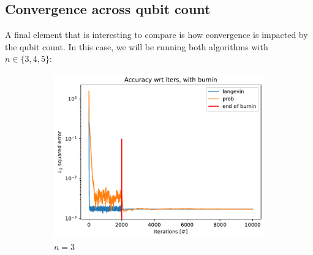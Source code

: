 \documentclass[12pt]{memoir}
\begin{document}
\subsection*{Convergence across qubit count}


A final element that is interesting to compare is how convergence is impacted by the qubit count. In this case, we will be running both algorithms with $n\in\{3,4,5\}$:


\begin{figure}[H]

    \centering

    \begin{subfigure}[b]{0.49\textwidth}


        \centering

        \includegraphics[width=\textwidth]{figures/experiments/baseline/diff_n_qubits/iters_acc_comp_iters_no_avg-1.png}

        \caption{$n=3$}

        \label{fig:conv-plot-diff-n-3-sub}

    \end{subfigure}
    \hfill
    \begin{subfigure}[b]{0.49\textwidth}


        \centering


\end{subfigure}
\end{figure}
\end{document}
